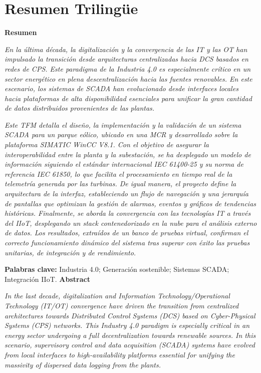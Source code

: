 \chapter*{Resumen Trilingüe}
\label{sec:abstract}
\vspace*{-10mm}

\textbf{Resumen}

\textit{En la última década, la digitalización y la convergencia de las \ac{IT} y las \ac{OT} han impulsado la transición desde arquitecturas centralizadas hacia \ac{DCS} basados en redes de \ac{CPS}. Este paradigma de la Industria 4.0 es especialmente crítico en un sector energético en plena descentralización hacia las fuentes renovables. En este escenario, los sistemas de \ac{SCADA} han evolucionado desde interfaces locales hacia plataformas de alta disponibilidad esenciales para unificar la gran cantidad de datos distribuidos provenientes de las plantas.}\par

\textit{Este \ac{TFM} detalla el diseño, la implementación y la validación de un sistema \ac{SCADA} para un parque eólico, ubicado en una \ac{MCR} y desarrollado sobre la plataforma SIMATIC WinCC V8.1. Con el objetivo de asegurar la interoperabilidad entre la planta y la subestación, se ha desplegado un modelo de información siguiendo el estándar internacional IEC 61400-25 y su norma de referencia IEC 61850, lo que facilita el procesamiento en tiempo real de la telemetría generada por las turbinas. De igual manera, el proyecto define la arquitectura de la interfaz, estableciendo un flujo de navegación y una jerarquía de pantallas que optimizan la gestión de alarmas, eventos y gráficos de tendencias históricas. Finalmente, se aborda la convergencia con las tecnologías \ac{IT} a través del \ac{IIoT}, desplegando un \textit{stack} contenedorizado en la nube para el análisis externo de datos. Los resultados, extraídos de un banco de pruebas virtual, confirman el correcto funcionamiento dinámico del sistema tras superar con éxito las pruebas unitarias, de integración y de rendimiento.}\par

\textbf{Palabras clave:} Industria 4.0; Generación sostenible; Sistemas \ac{SCADA}; Integración \ac{IIoT}.
\newpage
\vspace*{5mm}
\textbf{Abstract}

\textit{In the last decade, digitalization and Information Technology/Operational Technology (\ac{IT}/\ac{OT}) convergence have driven the transition from centralized architectures towards Distributed Control Systems (\ac{DCS}) based on Cyber-Physical Systems (\ac{CPS}) networks. This Industry 4.0 paradigm is especially critical in an energy sector undergoing a full decentralization towards renewable sources. In this scenario, supervisory control and data acquisition (\ac{SCADA}) systems have evolved from local interfaces to high-availability platforms essential for unifying the massivity of dispersed data logging from the plants.}\par


